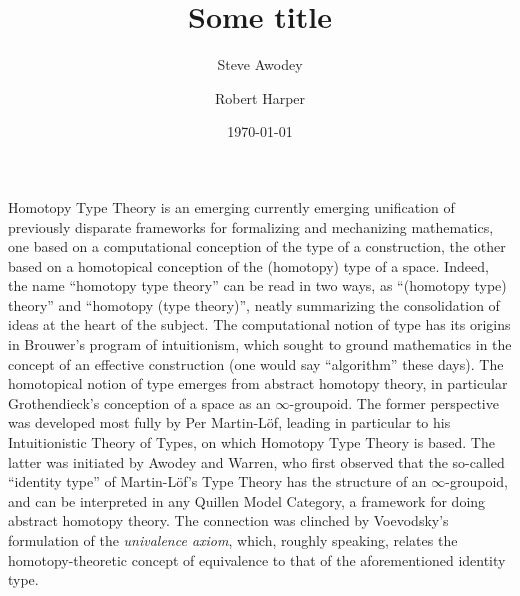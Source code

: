 \documentclass[11pt]{article}
\theoremstyle{remark}
\theoremstyle{definition}
\begin{document}

\title{Some title}
\author{Steve Awodey \and Robert Harper}
\date{\today}

\maketitle


Homotopy Type Theory is an emerging currently emerging unification of previously disparate frameworks for formalizing and mechanizing mathematics, one based on a computational conception of the type of a  construction, the other based on a homotopical conception of the (homotopy) type of a space.  Indeed, the name ``homotopy type theory'' can be read in two ways, as ``(homotopy type) theory'' and ``homotopy (type theory)'', neatly summarizing the consolidation of ideas at the heart of the subject.  The computational notion of type has its origins in Brouwer's program of intuitionism, which sought to ground mathematics in the concept of an effective construction (one would say ``algorithm'' these days).  The homotopical notion of type emerges from abstract homotopy theory, in particular Grothendieck's conception of a space as an $\infty$-groupoid.  The former perspective was developed most fully by Per Martin-L\"{o}f, leading in particular to his Intuitionistic Theory of Types, on which Homotopy Type Theory is based.  The latter was initiated by Awodey and Warren, who first observed that the so-called ``identity type'' of Martin-L\"{o}f's Type Theory has the structure of an $\infty$-groupoid, and can be interpreted in any Quillen Model Category, a framework for doing abstract homotopy theory.  The connection was clinched by Voevodsky's formulation of the \emph{univalence axiom}, which, roughly speaking, relates the homotopy-theoretic concept of equivalence to that of the aforementioned identity type.
\end{document}
